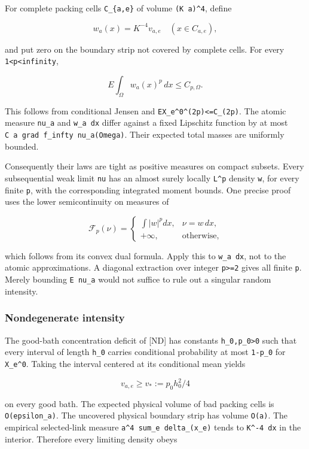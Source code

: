\documentclass[
  11pt,
]{article}
\begin{document}
For complete packing cells \texttt{C\_\{a,e\}} of volume
\texttt{(K\ a)\^{}4}, define

\[
 w_a(x)=K^{-4}v_{a,e}\quad(x\in C_{a,e}),
\]

and put zero on the boundary strip not covered by complete cells. For
every \texttt{1\textless{}p\textless{}infinity},

\[
 E\int_\Omega w_a(x)^p\,dx\le C_{p,\Omega}.
 \tag{17}
\]

This follows from conditional Jensen and
\texttt{E\textbar{}X\_e\^{}0\textbar{}\^{}(2p)\textless{}=C\_(2p)}. The
atomic measure \texttt{nu\_a} and \texttt{w\_a\ dx} differ against a
fixed Lipschitz function by at most
\texttt{C\ a\ \textbar{}\textbar{}grad\ f\textbar{}\textbar{}\_infty\ nu\_a(Omega)}.
Their expected total masses are uniformly bounded.

Consequently their laws are tight as positive measures on compact
subsets. Every subsequential weak limit \texttt{nu} has an almost surely
locally \texttt{L\^{}p} density \texttt{w}, for every finite \texttt{p},
with the corresponding integrated moment bounds. One precise proof uses
the lower semicontinuity on measures of

\[
 \mathcal F_p(\nu)=
 \begin{cases}
 \int|w|^p dx,&\nu=w\,dx,\\
 +\infty,&\text{otherwise},
 \end{cases}
\]

which follows from its convex dual formula. Apply this to
\texttt{w\_a\ dx}, not to the atomic approximations. A diagonal
extraction over integer \texttt{p\textgreater{}=2} gives all finite
\texttt{p}. Merely bounding \texttt{E\ nu\_a} would not suffice to rule
out a singular random intensity.

\hypertarget{nondegenerate-intensity}{%
\subsubsection{Nondegenerate intensity}\label{nondegenerate-intensity}}

The good-bath concentration deficit of [ND] has constants
\texttt{h\_0,p\_0\textgreater{}0} such that every interval of length
\texttt{h\_0} carries conditional probability at most \texttt{1-p\_0}
for \texttt{X\_e\^{}0}. Taking the interval centered at its conditional
mean yields

\[
 v_{a,e}\ge v_*:=p_0h_0^2/4
 \tag{18}
\]

on every good bath. The expected physical volume of bad packing cells is
\texttt{O(epsilon\_a)}. The uncovered physical boundary strip has volume
\texttt{O(a)}. The empirical selected-link measure
\texttt{a\^{}4\ sum\_e\ delta\_(x\_e)} tends to \texttt{K\^{}-4\ dx} in
the interior. Therefore every limiting density obeys
\end{document}
